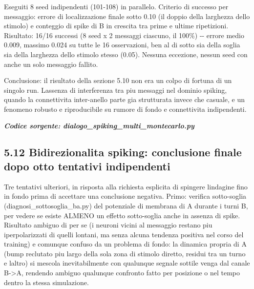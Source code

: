 \documentclass[
  italian,
]{article}
\begin{document}
Eseguiti 8 seed indipendenti (101-108) in parallelo. Criterio di successo per messaggio: errore di localizzazione finale sotto 0.10 (il doppio della larghezza dello stimolo) e conteggio di spike di B in crescita tra prime e ultime ripetizioni. Risultato: 16/16 successi (8 seed x 2 messaggi ciascuno, il 100\%) -\/- errore medio 0.009, massimo 0.024 su tutte le 16 osservazioni, ben al di sotto sia della soglia sia della larghezza dello stimolo stesso (0.05). Nessuna eccezione, nessun seed con anche un solo messaggio fallito.

Conclusione: il risultato della sezione 5.10 non era un colpo di fortuna di un singolo run. L\textquotesingle assenza di interferenza tra piu\textquotesingle{} messaggi nel dominio spiking, quando la connettivita\textquotesingle{} inter-anello parte gia\textquotesingle{} strutturata invece che casuale, e\textquotesingle{} un fenomeno robusto e riproducibile su rumore di fondo e connettivita\textquotesingle{} indipendenti.

\textit{\textbf{Codice sorgente: dialogo\_\allowbreak{}spiking\_\allowbreak{}multi\_\allowbreak{}montecarlo.py}}


\subsection{5.12 Bidirezionalita\textquotesingle{} spiking: conclusione finale dopo otto tentativi indipendenti}\label{bidirezionalita-spiking-conclusione-finale-dopo-otto-tentativi-indipendenti}

Tre tentativi ulteriori, in risposta alla richiesta esplicita di spingere l\textquotesingle indagine fino in fondo prima di accettare una conclusione negativa. Primo: verifica sotto-soglia (diagnosi\_\allowbreak{}sottosoglia\_\allowbreak{}ba.py) del potenziale di membrana di A durante i turni B, per vedere se esiste ALMENO un effetto sotto-soglia anche in assenza di spike. Risultato ambiguo di per se\textquotesingle{} (i neuroni vicini al messaggio restano piu\textquotesingle{} iperpolarizzati di quelli lontani, ma senza alcuna tendenza positiva nel corso del training) e comunque confuso da un problema di fondo: la dinamica propria di A (bump reclutato piu\textquotesingle{} largo della sola zona di stimolo diretto, residui tra un turno e l\textquotesingle altro) si mescola inevitabilmente con qualunque segnale sottile venga dal canale B-\textgreater A, rendendo ambiguo qualunque confronto fatto per posizione o nel tempo dentro la stessa simulazione.
\end{document}
